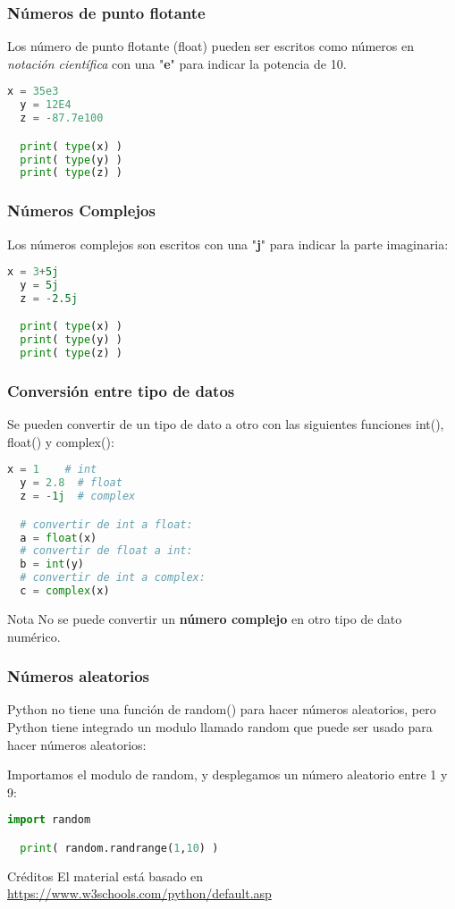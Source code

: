 \begin{frame}[fragile]
  \frametitle{Números de punto flotante}

  Los número de punto flotante (\textcolor{codeKeyword}{float}) pueden ser
  escritos como números en \emph{notación científica} con una "\textbf{e}"
  para indicar la potencia de 10.

  \begin{lstlisting}[language=Python]
  x = 35e3
  y = 12E4
  z = -87.7e100

  print( type(x) )
  print( type(y) )
  print( type(z) )
  \end{lstlisting}
\end{frame}

\begin{frame}[fragile]
  \frametitle{Números Complejos}

  Los números complejos son escritos con una "\textbf{j}" para indicar
  la parte imaginaria:

  \begin{lstlisting}[language=Python]
  x = 3+5j
  y = 5j
  z = -2.5j

  print( type(x) )
  print( type(y) )
  print( type(z) )
  \end{lstlisting}
\end{frame}

\begin{frame}[fragile]
  \frametitle{Conversión entre tipo de datos}

  Se pueden convertir de un tipo de dato a otro con las siguientes
  funciones \textcolor{codeKeyword}{int}(), \textcolor{codeKeyword}{float}()
  y \textcolor{codeKeyword}{complex}():

  \begin{lstlisting}[language=Python]
  x = 1    # int
  y = 2.8  # float
  z = -1j  # complex

  # convertir de int a float:
  a = float(x)
  # convertir de float a int:
  b = int(y)
  # convertir de int a complex:
  c = complex(x)
  \end{lstlisting}

  \begin{alertblock}{Nota}
    No se puede convertir un \textbf{número complejo} en otro tipo de dato numérico.
  \end{alertblock}
\end{frame}

\begin{frame}[fragile]
  \frametitle{Números aleatorios}

  Python no tiene una función de \textcolor{codeKeyword}{random}() para
  hacer números aleatorios, pero Python tiene integrado un modulo llamado
  \textcolor{codeKeyword}{random} que puede ser usado para hacer números
  aleatorios:

  \vspace{\baselineskip}
  Importamos el modulo de random, y desplegamos un número aleatorio entre 1
  y 9:

  \begin{lstlisting}[language=Python]
  import random

  print( random.randrange(1,10) )
  \end{lstlisting}
\end{frame}

\begin{frame}[c]{Créditos}
  El material está basado en
  \href{https://www.w3schools.com/python/default.asp}{https://www.w3schools.com/python/default.asp}
\end{frame}
